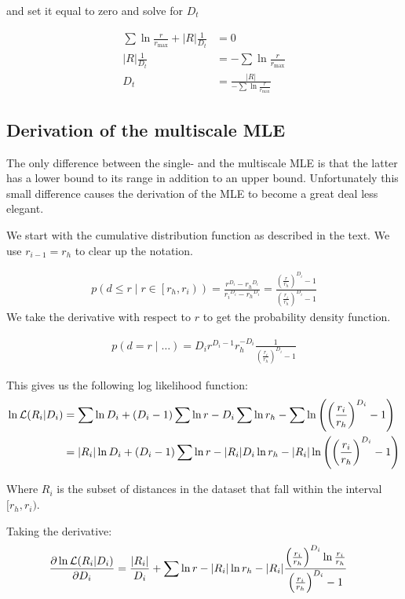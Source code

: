 \documentclass[11pt]{article}
\begin{document}
and set it equal to zero and solve for $D_t$

\begin{align*}
\sum{\ln \frac{r}{r_{\max}}} + |R|\frac{1}{D_t} &= 0 \\
|R|\frac{1}{D_t} &= - \sum{\ln \frac{r}{r_{\max}}} \\
D_t &= \frac{|R|}{- \sum{\ln \frac{r}{r_{\max}}}} 
\end{align*}

\subsection{Derivation of the multiscale MLE}

The only difference between the single- and the multiscale MLE is that the latter has a lower bound to its range in addition to an upper bound. Unfortunately this small difference causes the derivation of the MLE to become a great deal less elegant.

We start with the cumulative distribution function as described in the text. We use $r_{i-1} = r_h$ to clear up the notation.

\begin{align*}
p\left(d \leq r \mid r \in \left[r_h, r_i\right)\right) = \frac{r^{D_i} - {r_h}^{D_i}}{{r_i}^{D_i} - {r_{h}}^{D_i}} = \frac{\left(\frac{r}{r_h}\right)^{D_i} - 1}{\left(\frac{r_i}{r_h}\right)^{D_i} - 1}
\end{align*}
We take the derivative with respect to $r$ to get the probability density function.

\begin{align*}
p(d = r \mid \ldots) = {D_i} r^{D_i - 1} r_h^{-D_i} \frac{1}{\left(\frac{r_i}{r_h}\right)^{D_i} - 1}
\end{align*}

This gives us the following log likelihood function:
\begin{align*}
\ln{\cal L}(R_i|D_i) &= \sum \ln D_i +  (D_i-1) \sum \ln r - D_i \sum \ln r_h  - \sum \ln \left(\left(\frac{r_i}{r_h}\right)^{D_i} -1\right)\\
&=  |R_i|\ln D_i + (D_i - 1)\sum \ln r - |R_i| D_i \ln r_h - |R_i| \ln \left(\left(\frac{r_i}{r_h}\right)^{D_i} -1\right) 
\end{align*}

Where $R_i$ is the subset of distances in the dataset that fall within the interval $[r_h, r_i)$. 

Taking the derivative:
\begin{align*}
\frac {\partial \ln{\cal L}(R_i|D_i)}{\partial D_i} &=  \frac{|R_i|}{D_i} + \sum \ln r - |R_i|\ln r_h - |R_i| \frac{\left(\frac{r_i}{r_h}\right)^{D_i} \ln \frac{r_i}{r_h}}{\left(\frac{r_i}{r_h}\right)^{D_i} -1}
\end{align*}
\end{document}
